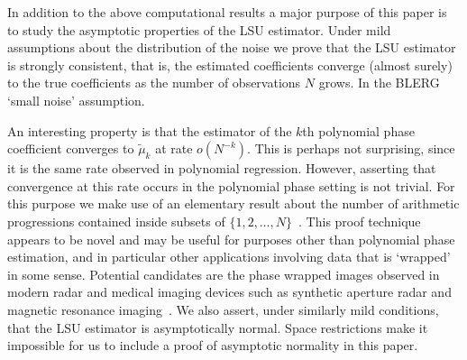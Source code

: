 \documentclass[journal]{IEEEtran}
\begin{document}
In addition to the above computational results a major purpose of this paper is to study the asymptotic properties of the LSU estimator.  Under mild assumptions about the distribution of the noise we prove that the LSU estimator is strongly consistent, that is, the estimated coefficients converge (almost surely) to the true coefficients as the number of observations $N$ grows.  %
In the   BLERG `small noise' assumption.

An interesting property is that the estimator of the $k$th polynomial phase coefficient converges to $\tilde{\mu}_k$ at rate $o(N^{-k})$.  This is perhaps not surprising, since it is the same rate observed in polynomial regression.  However, asserting that convergence at this rate occurs in the polynomial phase setting is not trivial.  For this purpose we make use of an elementary result about the number of arithmetic progressions contained inside subsets of $\{1,2,\dots,N\}$~\cite{Gowers_new_proof2001}.  %
This proof technique appears to be novel and may be useful for purposes other than polynomial phase estimation, and in particular other applications involving data that is `wrapped' in some sense.  Potential candidates are the phase wrapped images observed in modern radar and medical imaging devices such as synthetic aperture radar and magnetic resonance imaging~\cite{Nico_phaseunwrappingSAR_2000,Friedlander_PD_phaseunwrapping_1996}.  We also assert, under similarly mild conditions, that the LSU estimator is asymptotically normal. %
Space restrictions make it impossible for us to include a proof of asymptotic normality in this paper.
\end{document}
